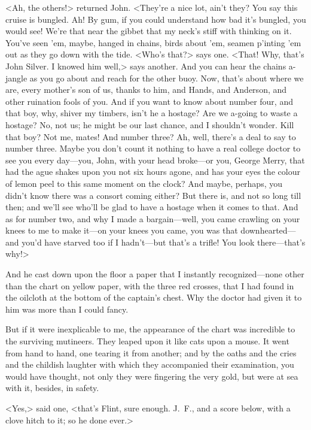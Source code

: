 <Ah, the others!> returned John. <They're a nice lot, ain't they? You say this cruise is bungled. Ah! By gum, if you could understand how bad it's bungled, you would see! We're that near the gibbet that my neck's stiff with thinking on it. You've seen 'em, maybe, hanged in chains, birds about 'em, seamen p'inting 'em out as they go down with the tide. <Who's that?> says one. <That! Why, that's John Silver. I knowed him well,> says another. And you can hear the chains a-jangle as you go about and reach for the other buoy. Now, that's about where we are, every mother's son of us, thanks to him, and Hands, and Anderson, and other ruination fools of you. And if you want to know about number four, and that boy, why, shiver my timbers, isn't he a hostage? Are we a-going to waste a hostage? No, not us; he might be our last chance, and I shouldn't wonder. Kill that boy? Not me, mates! And number three? Ah, well, there's a deal to say to number three. Maybe you don't count it nothing to have a real college doctor to see you every day—you, John, with your head broke—or you, George Merry, that had the ague shakes upon you not six hours agone, and has your eyes the colour of lemon peel to this same moment on the clock? And maybe, perhaps, you didn't know there was a consort coming either? But there is, and not so long till then; and we'll see who'll be glad to have a hostage when it comes to that. And as for number two, and why I made a bargain—well, you came crawling on your knees to me to make it—on your knees you came, you was that downhearted—and you'd have starved too if I hadn't—but that's a trifle! You look there—that's why!>

And he cast down upon the floor a paper that I instantly recognized—none other than the chart on yellow paper, with the three red crosses, that I had found in the oilcloth at the bottom of the captain's chest. Why the doctor had given it to him was more than I could fancy.

But if it were inexplicable to me, the appearance of the chart was incredible to the surviving mutineers. They leaped upon it like cats upon a mouse. It went from hand to hand, one tearing it from another; and by the oaths and the cries and the childish laughter with which they accompanied their examination, you would have thought, not only they were fingering the very gold, but were at sea with it, besides, in safety.

<Yes,> said one, <that's Flint, sure enough. J\@.~F\@., and a score below, with a clove hitch to it; so he done ever.>

